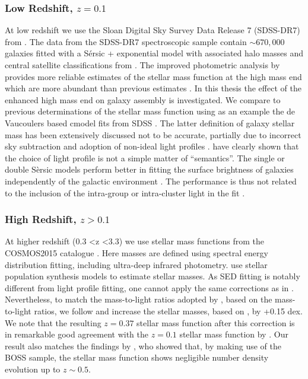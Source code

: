 \subsubsection{Low Redshift, $z = 0.1$}
\label{subsub:SDSS}
At low redshift we use the Sloan Digital Sky Survey Data Release 7 (SDSS-DR7) from \citet{Meert2015ASystematics}.
The data from the SDSS-DR7 spectroscopic sample \citep{Abazajian2009THESURVEY} contain $\sim 670,000$ galaxies fitted with a S\'ersic + exponential model \citep[PyMorph;][]{Meert2015ASystematics} with associated halo masses and central satellite classifications from \citep{Yang2012EvolutionHalos}. The improved photometric analysis by \citet{Meert2015ASystematics} provides more reliable estimates of the stellar mass function at the high mass end which are more abundant than previous estimates \citep{Bernardi2016TheEvolution, Bernardi2017ComparingLight}.
In this thesis the effect of the enhanced high mass end on galaxy assembly is investigated. We compare to previous determinations of the stellar mass function using as an example the de Vaucoulers \citep{deVaucouleurs1948RecherchesExtragalactiques} based cmodel fits from SDSS \citep{Abazajian2009THESURVEY}. The latter definition of galaxy stellar mass has been extensively discussed not to be accurate, partially due to incorrect sky subtraction and adoption of non-ideal light profiles \citep{Bernardi2013TheProfile}. \citet{Bernardi2017ComparingLight} have clearly shown that the choice of light profile is not a simple matter of ``semantics''. The single or double S\`ersic models perform better in fitting the surface brightness of galaxies independently of the galactic environment \citep{Meert2015ASystematics}. The performance is thus not related to the inclusion of the intra-group or intra-cluster light in the fit \citep{Bernardi2017ComparingLight}.

\subsubsection{High Redshift, $z > 0.1$}
\label{subsub:Davidzon}
At higher redshift (0.3 \textless z \textless 3.3) we use stellar mass functions from the COSMOS2015 catalogue \citep{Davidzon2017TheSnapshots}. Here masses are defined using spectral energy distribution fitting, including ultra-deep infrared photometry. \citet{Davidzon2017TheSnapshots} use \citet{Bruzual2003Stellar2003} stellar population synthesis models to estimate stellar masses. As SED fitting is notably different from light profile fitting, one cannot apply the same corrections as in \citet{Mendel2014ASURVEY}. 
Nevertheless, to match the mass-to-light ratios adopted by \citet{Mendel2014ASURVEY}, based on the \citet{Bell2003TheFunctions} mass-to-light ratios, we follow \citet{Bernardi2013TheProfile} and increase the \citet{Davidzon2017TheSnapshots} stellar masses, based on \citet{Bruzual2003Stellar2003}, by +0.15 dex. We note that the resulting $z=0.37$ stellar mass function after this correction is in remarkable good agreement with the $z=0.1$ stellar mass function by \citep{Bernardi2013TheProfile}. Our result also matches the findings by \citet{Bernardi2016TheEvolution}, who showed that, by making use of the BOSS sample, the stellar mass function shows negligible number density evolution up to $z \sim 0.5$.

